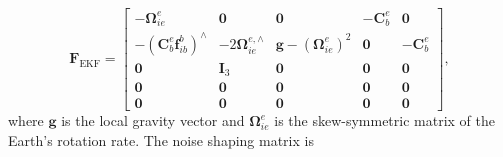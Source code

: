 \documentclass[conference]{IEEEtran}
\begin{document}

{\small
\begin{equation}
\mathbf F_{\text{EKF}}=
\begin{bmatrix}
-\boldsymbol{\Omega}_{ie}^{e}
& \mathbf 0
& \mathbf 0
& -\mathbf C_b^e
& \mathbf 0
\\
-\left(\mathbf C_b^e\boldsymbol f_{ib}^b\right)^\wedge 
& -2\boldsymbol{\Omega}_{ie}^{e,\wedge}
& \mathbf g-\left(\boldsymbol{\Omega}_{ie}^{e}\right)^2
& \mathbf 0
& -\mathbf C_b^e
\\
\mathbf 0
& \mathbf I_3
& \mathbf 0
& \mathbf 0
& \mathbf 0
\\
\mathbf 0
& \mathbf 0
& \mathbf 0
& \mathbf 0
& \mathbf 0
\\
\mathbf 0
& \mathbf 0
& \mathbf 0
& \mathbf 0
& \mathbf 0
\end{bmatrix},
\end{equation}}
where $\mathbf{g}$ is the local gravity vector and $\boldsymbol{\Omega}_{ie}^{e}$ is the skew-symmetric matrix of the Earth's rotation rate. The noise shaping matrix is
\end{document}
